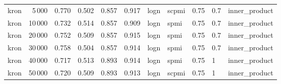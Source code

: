 \begin{tabular}{lrrrrrlllll}
    kron &            5\,000 &  0.770 &  0.502 &      0.857 &          0.917 &  logn &  scpmi &    0.75 &  0.7 &  inner\_product \\
    kron &           10\,000 &  0.732 &  0.514 &      0.857 &          0.909 &  logn &   spmi &    0.75 &  0.7 &  inner\_product \\
    kron &           20\,000 &  0.752 &  0.509 &      0.857 &          0.915 &  logn &   spmi &    0.75 &  0.7 &  inner\_product \\
    kron &           30\,000 &  0.758 &  0.504 &      0.857 &          0.914 &  logn &   spmi &    0.75 &  0.7 &  inner\_product \\
    kron &           40\,000 &  0.717 &  0.513 &      0.893 &          0.914 &  logn &   spmi &    0.75 &    1 &  inner\_product \\
    kron &           50\,000 &  0.720 &  0.509 &      0.893 &          0.913 &  logn &  scpmi &    0.75 &    1 &  inner\_product \\
\bottomrule
\end{tabular}
